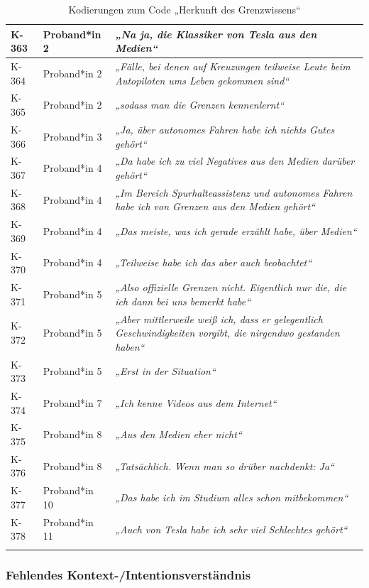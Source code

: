 {\begin{xltabular}{\textwidth}{
    |P{0.10\textwidth}
    |P{0.17\textwidth}
    |Y|
}
K-363 & Proband*in 2 & \textit{„Na ja, die Klassiker von Tesla aus den Medien“} \\
\hline
K-364 & Proband*in 2 & \textit{„Fälle, bei denen auf Kreuzungen teilweise Leute beim Autopiloten ums Leben gekommen sind“} \\
\hline
K-365 & Proband*in 2 & \textit{„sodass man die Grenzen kennenlernt“} \\
\hline
K-366 & Proband*in 3 & \textit{„Ja, über autonomes Fahren habe ich nichts Gutes gehört“} \\
\hline
K-367 & Proband*in 4 & \textit{„Da habe ich zu viel Negatives aus den Medien darüber gehört“} \\
\hline
K-368 & Proband*in 4 & \textit{„Im Bereich Spurhalteassistenz und autonomes Fahren habe ich von Grenzen aus den Medien gehört“} \\
\hline
K-369 & Proband*in 4 & \textit{„Das meiste, was ich gerade erzählt habe, über Medien“} \\
\hline
K-370 & Proband*in 4 & \textit{„Teilweise habe ich das aber auch beobachtet“} \\
\hline
K-371 & Proband*in 5 & \textit{„Also offizielle Grenzen nicht. Eigentlich nur die, die ich dann bei uns bemerkt habe“} \\
\hline
K-372 & Proband*in 5 & \textit{„Aber mittlerweile weiß ich, dass er gelegentlich Geschwindigkeiten vorgibt, die nirgendwo gestanden haben“} \\
\hline
K-373 & Proband*in 5 & \textit{„Erst in der Situation“} \\
\hline
K-374 & Proband*in 7 & \textit{„Ich kenne Videos aus dem Internet“} \\
\hline
K-375 & Proband*in 8 & \textit{„Aus den Medien eher nicht“} \\
\hline
K-376 & Proband*in 8 & \textit{„Tatsächlich. Wenn man so drüber nachdenkt: Ja“} \\
\hline
K-377 & Proband*in 10 & \textit{„Das habe ich im Studium alles schon mitbekommen“} \\
\hline
K-378 & Proband*in 11 & \textit{„Auch von Tesla habe ich sehr viel Schlechtes gehört“} \\
\hline
\caption{Kodierungen zum Code „Herkunft des Grenzwissens“}\label{tab:kodiernachweis-herkunft-des-grenzwissens}\\
\end{xltabular}
}

\clearpage
\subsubsection{Fehlendes Kontext-/Intentionsverständnis}

